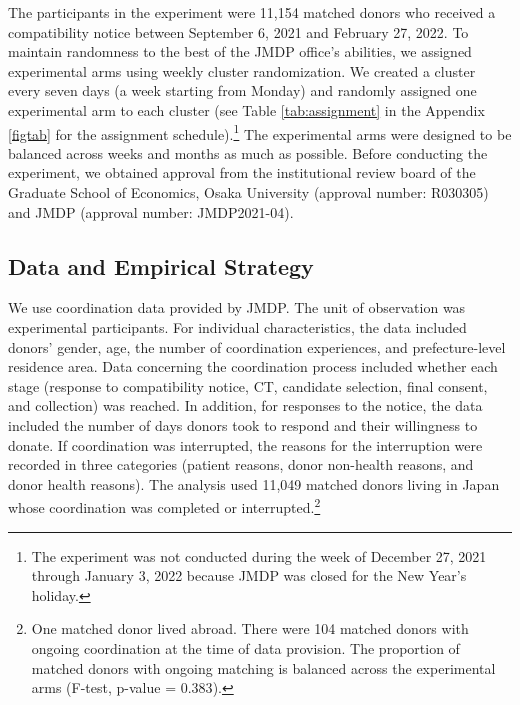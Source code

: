 \documentclass[12pt, a4paper]{article}
\begin{document}
The participants in the experiment were 11,154 matched donors who received a compatibility notice between September 6, 2021 and February 27, 2022. To maintain randomness to the best of the JMDP office's abilities, we assigned experimental arms using weekly cluster randomization. We created a cluster every seven days (a week starting from Monday) and randomly assigned one experimental arm to each cluster (see Table \ref{tab:assignment} in the Appendix \ref{figtab} for the assignment schedule).\footnote{The experiment was not conducted during the week of December 27, 2021 through January 3, 2022 because JMDP was closed for the New Year's holiday.} The experimental arms were designed to be balanced across weeks and months as much as possible. Before conducting the experiment, we obtained approval from the institutional review board of the Graduate School of Economics, Osaka University (approval number: R030305) and JMDP (approval number: JMDP2021-04).

\hypertarget{data-and-empirical-strategy}{%
\subsection{Data and Empirical Strategy}\label{data-and-empirical-strategy}}

We use coordination data provided by JMDP. The unit of observation was experimental participants. For individual characteristics, the data included donors' gender, age, the number of coordination experiences, and prefecture-level residence area. Data concerning the coordination process included whether each stage (response to compatibility notice, CT, candidate selection, final consent, and collection) was reached. In addition, for responses to the notice, the data included the number of days donors took to respond and their willingness to donate. If coordination was interrupted, the reasons for the interruption were recorded in three categories (patient reasons, donor non-health reasons, and donor health reasons). The analysis used 11,049 matched donors living in Japan whose coordination was completed or interrupted.\footnote{One matched donor lived abroad. There were 104 matched donors with ongoing coordination at the time of data provision. The proportion of matched donors with ongoing matching is balanced across the experimental arms (F-test, p-value = \(0.383\)).}
\end{document}

